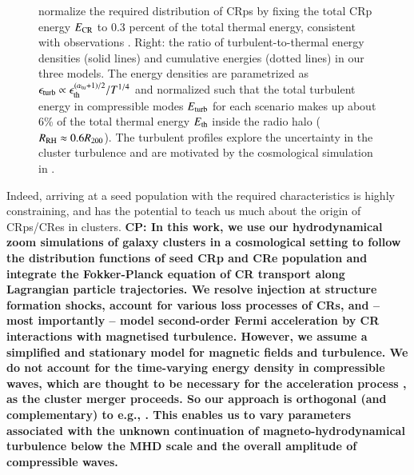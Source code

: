 \documentclass[a4paper,fleqn,usenatbib]{mnras}
\def\CP#1{{\bf {\color{mygreen} CP: #1}}}
\begin{document}
\begin{figure}
{{      normalize the required distribution of CRps by fixing the total
      CRp energy $E_{\mathrm{CR}}$ to 0.3 percent of the total thermal
      energy, consistent with observations
      \citep{2014ApJ...787...18A,2012ApJ...757..123A}. Right: the
      ratio of turbulent-to-thermal energy densities (solid lines) and
      cumulative energies (dotted lines) in our three models. The
      energy densities are parametrized as $\epsilon_{\mathrm{turb}}
      \propto \epsilon_{\mathrm{th}}^{(\alpha_{{\mathrm{tu}}}+1)/2}/T^{1/4}$ and
      normalized such that the total turbulent energy in compressible
      modes $E_{\mathrm{turb}}$ for each scenario makes up about 6\% of the
      total thermal energy $E_{\mathrm{th}}$ inside the radio halo
      ($R_{\mathrm{RH}}\approx0.6R_{200}$). The turbulent profiles explore
      the uncertainty in the cluster turbulence and are motivated by
      the cosmological simulation in
      \citep{2009ApJ...705.1129L,2010ApJ...725.1452S,2011A&A...529A..17V}.}}
  \label{fig:Edens}
\end{figure}

Indeed, arriving at a seed population with the required
characteristics is highly constraining, and has the potential to teach
us much about the origin of CRps/CRes in clusters.  \CP{In this work,
  we use our hydrodynamical zoom simulations of galaxy clusters in a
  cosmological setting to follow the distribution functions of seed
  CRp and CRe population and integrate the Fokker-Planck equation of
  CR transport along Lagrangian particle trajectories. We resolve
  injection at structure formation shocks, account for various loss
  processes of CRs, and -- most importantly -- model second-order
  Fermi acceleration by CR interactions with magnetised
  turbulence. However, we assume a simplified and stationary model for
  magnetic fields and turbulence. We do not account for the
  time-varying energy density in compressible waves, which are thought
  to be necessary for the acceleration process
  \citep{brunetti07,brunetti11}, as the cluster merger proceeds.  So
  our approach is orthogonal (and complementary) to e.g.,
  \citealp{2015ApJ...800...60M}. This enables us to vary parameters
  associated with the unknown continuation of magneto-hydrodynamical
  turbulence below the MHD scale and the overall amplitude of
  compressible waves.}
\end{document}
